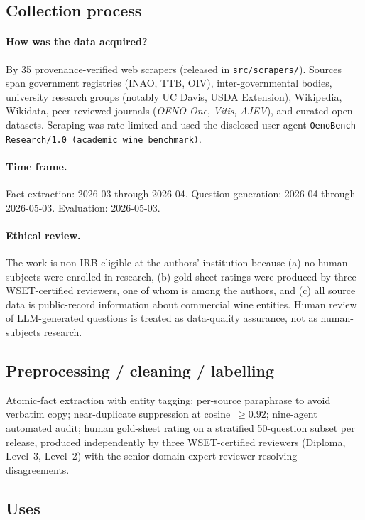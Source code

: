 \subsection{Collection process}
\paragraph{How was the data acquired?}
By 35 provenance-verified web scrapers (released in
\texttt{src/scrapers/}). Sources span government registries (INAO,
TTB, OIV), inter-governmental bodies, university research groups
(notably UC Davis, USDA Extension), Wikipedia, Wikidata, peer-reviewed
journals (\emph{OENO One}, \emph{Vitis}, \emph{AJEV}), and curated
open datasets. Scraping was rate-limited and used the disclosed user
agent \texttt{OenoBench-Research/1.0 (academic wine benchmark)}.

\paragraph{Time frame.}
Fact extraction: 2026-03 through 2026-04. Question generation:
2026-04 through 2026-05-03. Evaluation: 2026-05-03.

\paragraph{Ethical review.}
The work is non-IRB-eligible at the authors' institution because
(a) no human subjects were enrolled in research, (b) gold-sheet
ratings were produced by three WSET-certified reviewers, one of whom
is among the authors, and (c) all source data is public-record
information about commercial wine entities. Human review of
LLM-generated questions is treated as data-quality assurance, not as
human-subjects research.

\subsection{Preprocessing / cleaning / labelling}
Atomic-fact extraction with entity tagging; per-source paraphrase to
avoid verbatim copy; near-duplicate suppression at cosine~$\geq 0.92$;
nine-agent automated audit; human gold-sheet rating on a stratified
50-question subset per release, produced independently by three
WSET-certified reviewers (Diploma, Level~3, Level~2) with the senior
domain-expert reviewer resolving disagreements.

\subsection{Uses}
